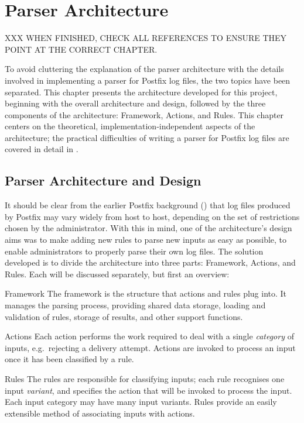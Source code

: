 \chapter{Parser Architecture}

\label{parser architecture}

XXX WHEN FINISHED, CHECK ALL REFERENCES TO ENSURE THEY POINT AT THE CORRECT
CHAPTER\@.

To avoid cluttering the explanation of the parser architecture with the
details involved in implementing a parser for Postfix log files, the two
topics have been separated.  This chapter presents the architecture
developed for this project, beginning with the overall architecture and
design, followed by the three components of the architecture: Framework,
Actions, and Rules.  This chapter centers on the theoretical,
implementation-independent aspects of the architecture; the practical
difficulties of writing a parser for Postfix log files are covered in
detail in .

\section{Parser Architecture and Design}

\label{parser design}

It should be clear from the earlier Postfix background () that log files produced by Postfix may vary widely from host
to host, depending on the set of restrictions chosen by the administrator.
With this in mind, one of the architecture's design aims was to make adding
new rules to parse new inputs as easy as possible, to enable administrators
to properly parse their own log files.  The solution developed is to divide
the architecture into three parts: Framework, Actions, and Rules.  Each
will be discussed separately, but first an overview:

\begin{eqlist}

    \item [Framework]  The framework is the structure that actions and
        rules plug into.  It manages the parsing process, providing shared
        data storage, loading and validation of rules, storage of results,
        and other support functions.

    \item [Actions] Each action performs the work required to deal with a
        single \textit{category\/} of inputs, e.g.\ rejecting a delivery
        attempt.  Actions are invoked to process an input once it has been
        classified by a rule.

    \item [Rules]  The rules are responsible for classifying inputs; each
        rule recognises one input \textit{variant}, and specifies the
        action that will be invoked to process the input.  Each input
        category may have many input variants.  Rules provide an easily
        extensible method of associating inputs with actions.

\end{eqlist}

